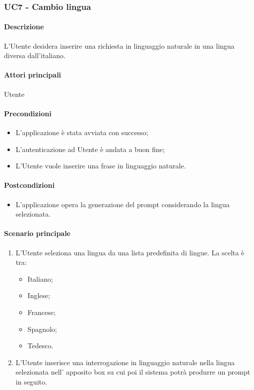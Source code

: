 \subsubsection{UC7 - Cambio lingua}\label{UC7}
\paragraph*{Descrizione}
L’Utente desidera inserire una richiesta in linguaggio naturale in una lingua diversa dall’italiano.

\paragraph*{Attori principali}
Utente

\paragraph*{Precondizioni}
\begin{itemize}
  \item L'applicazione è stata avviata con successo;
  \item L’autenticazione ad Utente è andata a buon fine;
  \item L’Utente vuole inserire una frase in linguaggio naturale.
\end{itemize}

\paragraph*{Postcondizioni}
\begin{itemize}
  \item L'applicazione opera la generazione del prompt considerando la lingua selezionata.
\end{itemize}

\paragraph*{Scenario principale}
\begin{enumerate}
  \item L’Utente seleziona una lingua da una lista predefinita di lingue. La scelta è tra:
    \begin{itemize}
      \item Italiano;
      \item Inglese;
      \item Francese;
      \item Spagnolo;
      \item Tedesco.
    \end{itemize}
  \item L’Utente inserisce una interrogazione in linguaggio naturale nella lingua selezionata nell’ apposito box su cui poi il sistema potrà produrre un prompt in seguito. 
\end{enumerate}

